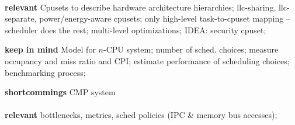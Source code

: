 \paragraph{ \cite{ousterhout_scheduling_1982} }
\paragraph{ \cite{watts_practical_1998} }

\paragraph{ \cite{banikazemi_pam_2008} }
\textbf{relevant} Cpusets to describe hardware architecture hierarchies;
\gls{llc}-sharing, \gls{llc}-separate, power/energy-aware cpusets;
only high-level task-to-cpuset mapping -- scheduler does the rest;
multi-level optimizations;
IDEA: security cpuset;

\textbf{keep in mind} Model for $n$-CPU system;
number of sched. choices;
measure occupancy and miss ratio and CPI;
estimate performance of scheduling choices;
benchmarking process;

\textbf{ shortcommings } CMP system

\paragraph{ \cite{ zhang_processor_2007 } }
\textbf{relevant} bottlenecks, metrics, sched policies (IPC \& memory bus
accesses);
